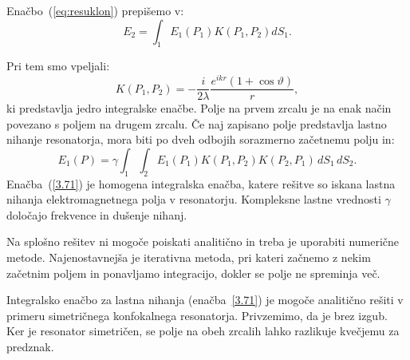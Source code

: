 Enačbo~(\ref{eq:resuklon}) prepišemo v:
\begin{equation}
E_2 =  \int_{1}E_{1}(P_{1})K(P_{1},P_{2})dS_{1}.
\end{equation}

Pri tem smo vpeljali:
\begin{equation}
K(P_{1},P_{2}) = -\frac{i}{2\lambda}\frac{e^{ikr}(1+\cos\vartheta)}{r},
\label{jedro}
\end{equation}
ki predstavlja jedro integralske enačbe. Polje na prvem zrcalu je 
na enak način povezano s poljem na drugem zrcalu. Če naj zapisano polje predstavlja lastno nihanje
resonatorja, mora biti po dveh odbojih sorazmerno začetnemu polju in:
\begin{equation}
E_{1}(P)=\gamma\int_{1}\int_{2}E_{1}(P_{1})K(P_{1},P_{2})K(P_{2},P_1)\, dS_{1}\, dS_{2}.
\label{3.71}
\end{equation}
Enačba~(\ref{3.71}) je homogena integralska enačba, katere
rešitve so iskana lastna nihanja elektromagnetnega polja v resonatorju.
Kompleksne lastne vrednosti $\gamma$ določajo frekvence in dušenje
nihanj. 

Na splošno rešitev ni mogoče poiskati analitično in treba je uporabiti 
numerične metode. Najenostavnejša je iterativna
metoda, pri kateri začnemo z nekim začetnim poljem in ponavljamo integracijo, 
dokler se polje ne spreminja več.

Integralsko enačbo za lastna nihanja (enačba~\ref{3.71}) je mogoče analitično rešiti v primeru
simetričnega konfokalnega resonatorja. Privzemimo, da je brez izgub. 
Ker je resonator simetričen, se polje na obeh zrcalih lahko razlikuje kvečjemu
za predznak.

